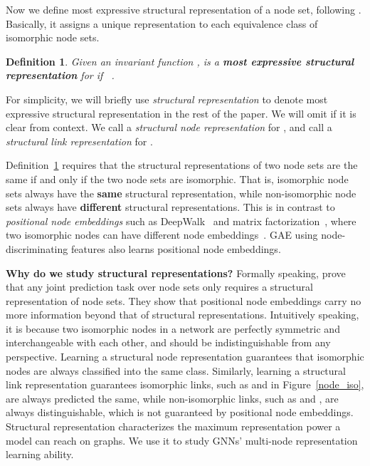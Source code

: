 \documentclass{article}
\newtheorem{definition}{Definition}
\begin{document}
Now we define most expressive structural representation of a node set, following \citep{Srinivasan2020On,li2020distance}. Basically, it assigns a unique representation to each equivalence class of isomorphic node sets.

\begin{definition}\label{structuralrepresentation}
Given an invariant function ,  is a \textbf{most expressive structural representation} for  if ~.
\end{definition}

For simplicity, we will briefly use \textit{structural representation} to denote most expressive structural representation in the rest of the paper. We will omit  if it is clear from context. We call  a \textit{structural node representation} for , and call  a \textit{structural link representation} for . 




Definition~\ref{structuralrepresentation} requires that the structural representations of two node sets are the same if and only if the two node sets are isomorphic. That is, isomorphic node sets always have the \textbf{same} structural representation, while non-isomorphic node sets always have \textbf{different} structural representations.
This is in contrast to \textit{positional node embeddings} such as DeepWalk~\citep{perozzi2014deepwalk} and matrix factorization~\citep{mnih2008probabilistic}, where two isomorphic nodes can have different node embeddings~\citep{ribeiro2017struc2vec}. GAE using node-discriminating features also learns positional node embeddings.





\textbf{Why do we study structural representations?} Formally speaking, \citet{Srinivasan2020On} prove that any joint prediction task over node sets only requires a structural representation of node sets. They show that positional node embeddings carry no more information beyond that of structural representations. Intuitively speaking, it is because two isomorphic nodes in a network are perfectly symmetric and interchangeable with each other, and should be indistinguishable from any perspective. Learning a structural node representation guarantees that isomorphic nodes are always classified into the same class. Similarly, learning a structural link representation guarantees isomorphic links, such as  and  in Figure~\ref{node_iso}, are always predicted the same, while non-isomorphic links, such as  and , are always distinguishable, which is not guaranteed by positional node embeddings. Structural representation characterizes the maximum representation power a model can reach on graphs. We use it to study GNNs' multi-node representation learning ability. 
\end{document}
